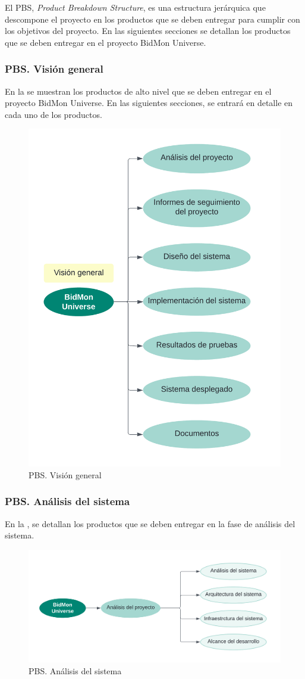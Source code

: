 El PBS, \textit{Product Breakdown Structure}, es una estructura jerárquica que descompone el proyecto en los productos que se deben entregar para cumplir 
con los objetivos del proyecto. 
En las siguientes secciones se detallan los productos que se deben entregar en el proyecto BidMon Universe.

\subsubsection{PBS. Visión general}
En la  se muestran los productos de alto nivel que se deben entregar en el proyecto BidMon Universe. 
En las siguientes secciones, se entrará en detalle en cada uno de los productos.

\begin{figure}[H]
    \hypertarget{fig:5_PBS-Vision-General}{}
    \centering
    \includegraphics[width=0.5\linewidth]{figures/5-PBS/5_PBS-Vision-General.png}
    \caption{PBS. Visión general}
    \label{fig:5_PBS-Vision-General}
\end{figure}


\subsubsection{PBS. Análisis del sistema}
En la , se detallan los productos que se deben entregar en la fase de análisis del sistema.
\begin{figure}[H]
    \hypertarget{fig:5_PBS-Analisis-Sistema}{}
    \centering
    \includegraphics[width=0.7\linewidth]{figures/5-PBS/5_PBS-Analisis.png}
    \caption{PBS. Análisis del sistema}
    \label{fig:5_PBS-Analisis-Sistema}
\end{figure}

